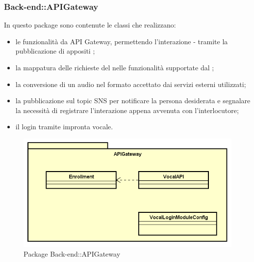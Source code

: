 \subsubsection{Back-end::APIGateway}
In questo package sono contenute le classi che realizzano:
\begin{itemize}
 \item le funzionalità da API Gateway, permettendo l'interazione  -  tramite la pubblicazione di appositi ;    \item la mappatura delle richieste del  nelle funzionalità supportate dal ;
 \item la conversione di un audio nel formato accettato dai servizi esterni utilizzati;
 \item la pubblicazione sul topic SNS per notificare la persona desiderata e segnalare la necessità di registrare l'interazione appena avvenuta con l'interlocutore;
 \item il login tramite impronta vocale.
\end{itemize}
\begin{figure}[h] \centering \includegraphics[width=\textwidth,height=\textheight,keepaspectratio]{images/diagrams/back-end/Official_Backend_0304/APIGateway.png}
\caption{Package Back-end::APIGateway}
\end{figure}

